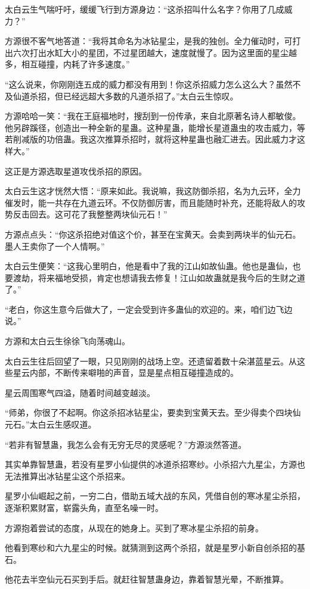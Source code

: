 \begin{this_body}
太白云生气喘吁吁，缓缓飞行到方源身边：“这杀招叫什么名字？你用了几成威力？”

方源很不客气地答道：“我将其命名为冰钻星尘，是我的独创。全力催动时，可打出六次打出水缸大小的星团，不过星团越大，速度就慢了。因为这里面的星尘越多，相互碰撞，内耗了许多速度。”

“这么说来，你刚刚连五成的威力都没有用到！你这杀招威力怎么这么大？虽然不及仙道杀招，但已经远超大多数的凡道杀招了。”太白云生惊叹。

方源哈哈一笑：“我在王庭福地时，搜刮到一份传承，来自北原著名诗人都敏俊。他另辟蹊径，创造出一种全新的星蛊。这种星蛊，能增长星道蛊虫的攻击威力，等若削减版的功倍蛊。我这次推算杀招时，就将这种星蛊也融汇进去。因此威力才这样大。”

这正是方源选取星道攻伐杀招的原因。

太白云生这才恍然大悟：“原来如此。我说嘛，我这防御杀招，名为九云环，全力催发时，能一共存在九道云环。不仅防御厉害，而且能随时补充，还能将敌人的攻势反击回去。这可花了我整整两块仙元石！”

方源点点头：“你这杀招绝对值这个价，甚至在宝黄天。会卖到两块半的仙元石。墨人王卖你了一个人情啊。”

太白云生便笑：“这我心里明白，他是看中了我的江山如故仙蛊。他也是蛊仙，也要渡劫，将来福地受损，肯定也想请我去修复！江山如故蛊就是我今后的生财之道了。”

“老白，你这生意今后做大了，一定会受到许多蛊仙的欢迎的。来，咱们边飞边说。”

方源和太白云生徐徐飞向荡魂山。

太白云生往后回望了一眼，只见刚刚的战场上空。还遗留着数十朵湛蓝星云。从这些星云内部，不断传来噼啪的声音，显是星点相互碰撞造成的。

星云周围寒气四溢，随着时间越变越淡。

“师弟，你很了不起啊。你这杀招冰钻星尘，要卖到宝黄天去。至少得卖个四块仙元石。”太白云生感叹道。

“若非有智慧蛊，我怎么会有无穷无尽的灵感呢？”方源淡然答道。

其实单靠智慧蛊，若没有星罗小仙提供的冰道杀招寒纱。小杀招六九星尘，方源也无法推算出冰钻星尘这个杀招来。

星罗小仙崛起之前，一穷二白，借助五域大战的东风，凭借自创的寒冰星尘杀招，逐渐积累财富，崭露头角，直至名噪一时。

方源抱着尝试的态度，从现在的她身上。买到了寒冰星尘杀招的前身。

他看到寒纱和六九星尘的时候。就猜测到这两个杀招，就是星罗小新自创杀招的基石。

他花去半空仙元石买到手后。就赶往智慧蛊身边，靠着智慧光晕，不断推算。


\end{this_body}
